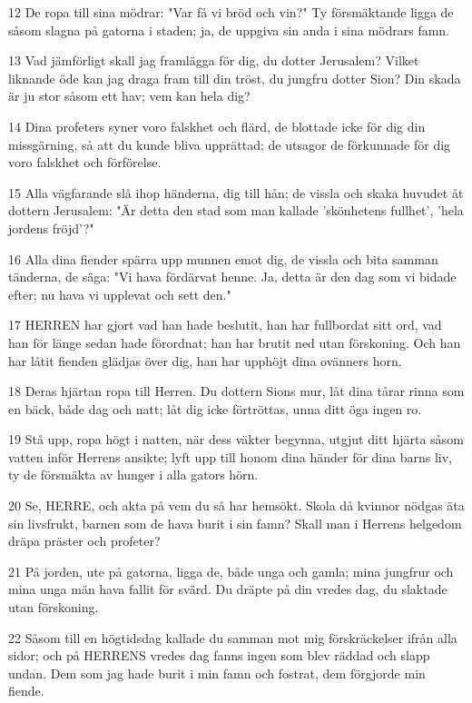 \par 12 De ropa till sina mödrar: "Var få vi bröd och vin?" Ty försmäktande ligga de såsom slagna på gatorna i staden; ja, de uppgiva sin anda i sina mödrars famn.
\par 13 Vad jämförligt skall jag framlägga för dig, du dotter Jerusalem? Vilket liknande öde kan jag draga fram till din tröst, du jungfru dotter Sion? Din skada är ju stor såsom ett hav; vem kan hela dig?
\par 14 Dina profeters syner voro falskhet och flärd, de blottade icke för dig din missgärning, så att du kunde bliva upprättad; de utsagor de förkunnade för dig voro falskhet och förförelse.
\par 15 Alla vägfarande slå ihop händerna, dig till hån; de vissla och skaka huvudet åt dottern Jerusalem: "Är detta den stad som man kallade 'skönhetens fullhet', 'hela jordens fröjd'?"
\par 16 Alla dina fiender spärra upp munnen emot dig, de vissla och bita samman tänderna, de säga: "Vi hava fördärvat henne. Ja, detta är den dag som vi bidade efter; nu hava vi upplevat och sett den."
\par 17 HERREN har gjort vad han hade beslutit, han har fullbordat sitt ord, vad han för länge sedan hade förordnat; han har brutit ned utan förskoning. Och han har låtit fienden glädjas över dig, han har upphöjt dina ovänners horn.
\par 18 Deras hjärtan ropa till Herren. Du dottern Sions mur, låt dina tårar rinna som en bäck, både dag och natt; låt dig icke förtröttas, unna ditt öga ingen ro.
\par 19 Stå upp, ropa högt i natten, när dess väkter begynna, utgjut ditt hjärta såsom vatten inför Herrens ansikte; lyft upp till honom dina händer för dina barns liv, ty de försmäkta av hunger i alla gators hörn.
\par 20 Se, HERRE, och akta på vem du så har hemsökt. Skola då kvinnor nödgas äta sin livsfrukt, barnen som de hava burit i sin famn? Skall man i Herrens helgedom dräpa präster och profeter?
\par 21 På jorden, ute på gatorna, ligga de, både unga och gamla; mina jungfrur och mina unga män hava fallit för svärd. Du dräpte på din vredes dag, du slaktade utan förskoning.
\par 22 Såsom till en högtidsdag kallade du samman mot mig förskräckelser ifrån alla sidor; och på HERRENS vredes dag fanns ingen som blev räddad och slapp undan. Dem som jag hade burit i min famn och fostrat, dem förgjorde min fiende.

